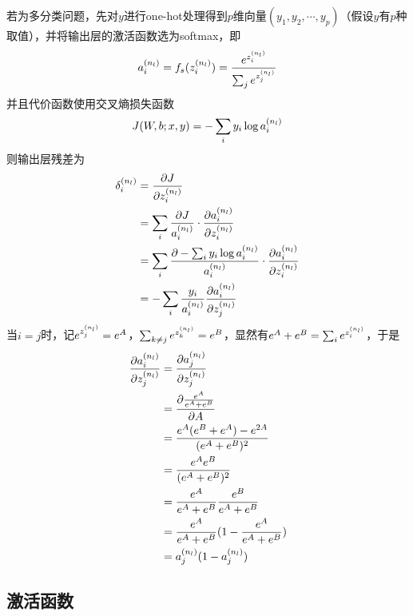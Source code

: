 若为多分类问题，先对$y$进行one-hot处理得到$p$维向量$(y_1,y_2,\cdots,y_p)$（假设$y$有$p$种取值），并将输出层的激活函数选为softmax，即
\begin{eqnarray}
\samplet{a}{n_l}{i}=f_s(\samplet{z}{n_l}{i})=\frac{e^{\samplet{z}{n_l}{i}}}{\sum_je^{\samplet{z}{n_l}{j}}}
\end{eqnarray}
并且代价函数使用交叉熵损失函数
\begin{eqnarray}
J(W,b;x,y)=-\sum_i y_i\log \samplet{a}{n_l}{i}
\end{eqnarray}
则输出层残差为
\begin{eqnarray}
\begin{aligned}
\samplet{\delta}{n_l}{i}&= \frac{\partial J}{\partial \samplet{z}{n_l}{i}}\\
&=\sum_i\frac{\partial J}{\samplet{a}{n_l}{i}}\cdot\frac{\partial \samplet{a}{n_l}{i}}{\partial \samplet{z}{n_l}{i}}\\
&=\sum_i\frac{\partial -\sum_i y_i\log\samplet{a}{n_l}{i}}{\samplet{a}{n_l}{i}}\cdot\frac{\partial \samplet{a}{n_l}{i}}{\partial \samplet{z}{n_l}{i}}\\
&=-\sum_i\frac{y_i}{\samplet{a}{n_l}{i}}\frac{\partial \samplet{a}{n_l}{i}}{\partial \samplet{z}{n_l}{j}}
\end{aligned}
\end{eqnarray}
当$i=j$时，记$e^{\samplet{z}{n_l}{j}}=e^A$，$\sum_{k\neq j}e^{\samplet{z}{n_l}{k}}=e^B$，显然有$e^A+e^B=\sum_ie^{\samplet{z}{n_l}{i}}$，于是
\begin{eqnarray}
\begin{aligned}
\frac{\partial \samplet{a}{n_l}{i}}{\partial \samplet{z}{n_l}{j}} &= \frac{\partial \samplet{a}{n_l}{j}}{\partial \samplet{z}{n_l}{j}}\\
&= \frac{\partial \frac{e^A}{e^A+e^B}}{\partial A}\\
&= \frac{e^A(e^B+e^A)-e^{2A}}{(e^A+e^B)^2}\\
&= \frac{e^Ae^B}{(e^A+e^B)^2}\\
&= \frac{e^A}{e^A+e^B}\frac{e^B}{e^A+e^B}\\
&= \frac{e^A}{e^A+e^B}(1-\frac{e^A}{e^A+e^B})\\
&= \samplet{a}{n_l}{j}(1-\samplet{a}{n_l}{j})
\end{aligned}
\end{eqnarray}
\subsection{激活函数}
